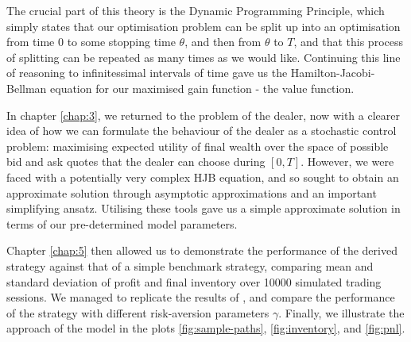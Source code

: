 The crucial part of this theory is the Dynamic Programming Principle, which simply states
that our optimisation problem can be split up into an optimisation from time 0 to 
some stopping time $\theta$, and then from $\theta$ to $T$, and that this process of 
splitting can be repeated as many times as we would like. Continuing this line of reasoning
to infinitessimal intervals of time gave us the Hamilton-Jacobi-Bellman equation for 
our maximised gain function - the value function.

In chapter \ref{chap:3}, we returned to the problem of the dealer, now with a clearer 
idea of how we can formulate the behaviour of the dealer as a stochastic control problem:
maximising expected utility of final wealth over the space of possible bid and ask quotes
that the dealer can choose during $[0,T]$. However, we were faced with a potentially 
very complex HJB equation, and so sought to obtain an approximate solution through 
asymptotic approximations and an important simplifying ansatz. Utilising these tools 
gave us a simple approximate solution in terms of our pre-determined model parameters.

Chapter \ref{chap:5} then allowed us to demonstrate the performance of the derived 
strategy against that of a simple benchmark strategy, comparing mean and standard 
deviation of profit and final inventory over 10000 simulated trading sessions. We 
managed to replicate the results of \cite{AS2008}, and compare the performance of the 
strategy with different risk-aversion parameters $\gamma$. Finally, we illustrate 
the approach of the model in the plots \ref{fig:sample-paths}, \ref{fig:inventory},
and \ref{fig:pnl}.
